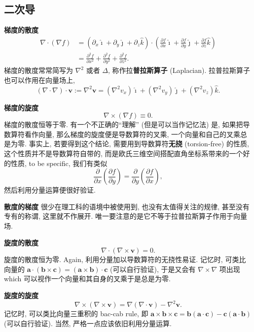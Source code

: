 \subsection{二次导}

\textbf{梯度的散度} \[
\begin{aligned}
\boxed{\nabla\cdot(\nabla f)}&=(\partial_x\hat{\imath}+\partial_y\hat{\jmath}+\partial_z\hat{k})\cdot\left(\frac{\partial f}{\partial x}\hat{\imath}+\frac{\partial f}{\partial y}\hat{\jmath}+\frac{\partial f}{\partial z}\hat{k}\right)\\
&\boxed{=\frac{\partial^2 f}{\partial x^2}+\frac{\partial^2 f}{\partial y^2}+\frac{\partial^2 f}{\partial z^2}}.
\end{aligned}
\] 梯度的散度常常简写为 $\nabla^2$ 或者 $\Delta$,
称作拉\textbf{普拉斯算子} (Laplacian). 拉普拉斯算子也可以作用在向量场上,
\[
\boxed{(\nabla\cdot\nabla)\cdot\boldsymbol{v}:=\nabla^2\boldsymbol{v}=(\nabla^2v_x)\hat{\imath}+(\nabla^2v_y)\hat{\jmath}+(\nabla^2v_z)\hat{k}}.
\]

\textbf{梯度的旋度} \[
\boxed{\nabla\times(\nabla f)\equiv0}.
\] 梯度的散度恒等于零. 有一个不正确的``理解'' (但是可以当作记忆法) 是,
如果把导数算符看作向量, 那么梯度的旋度便是导数算符的叉乘,
一个向量和自己的叉乘总是为零. 事实上, 若要得到这个结论,
需要用到导数算符\textbf{无挠} (torsion-free) 的性质,
这个性质并不是导数算符自带的,
而是欧氏三维空间搭配直角坐标系带来的一个好的性质, to be specific,
我们有类似 \[
\frac{\partial}{\partial x}\left(\frac{\partial f}{\partial y}\right)=\frac{\partial}{\partial y}\left(\frac{\partial f}{\partial x}\right),
\] 然后利用分量运算便很好验证.

\textbf{散度的梯度} 很少在理工科的语境中被使用到,
也没有太值得关注的规律, 甚至没有专有的称谓, 这里就不作展开.
唯一要注意的是它不等于拉普拉斯算子作用于向量场.

\textbf{旋度的散度} \[
\boxed{\nabla\cdot(\nabla\times\boldsymbol{v})=0}.
\] 旋度的散度恒为零. Again, 利用分量加以导数算符的无挠性易证. 记忆时,
可类比向量的
$\boldsymbol{a}\cdot(\boldsymbol{b}\times\boldsymbol{c})=(\boldsymbol{a}\times\boldsymbol{b})\cdot\boldsymbol{c}$
(可以自行验证), 于是又会有 $\nabla\times\nabla$ 项出现 which
可以视作一个向量和其自身的叉乘于是总是为零.

\textbf{旋度的旋度} \[
\boxed{\nabla\times(\nabla\times\boldsymbol{v})=\nabla(\nabla\cdot\boldsymbol{v})-\nabla^2\boldsymbol{v}}.
\] 记忆时, 可以类比向量三重积的 bac-cab rule, 即
$\boldsymbol{a}\times\boldsymbol{b}\times\boldsymbol{c}=\boldsymbol{b}(\boldsymbol{a}\cdot\boldsymbol{c})-\boldsymbol{c}(\boldsymbol{a}\cdot\boldsymbol{b})$
(可以自行验证). 当然, 严格一点应该依旧利用分量运算.
